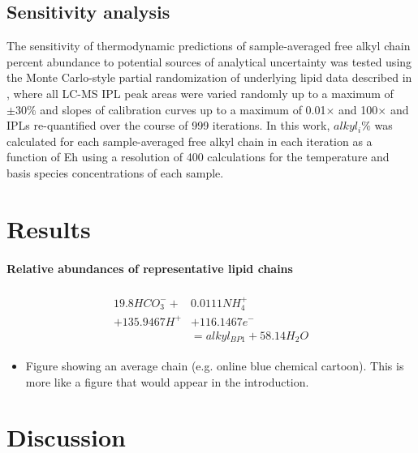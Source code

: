 \subsection{Sensitivity analysis} The sensitivity of thermodynamic predictions of sample-averaged free alkyl chain percent abundance to potential sources of analytical uncertainty was tested using the Monte Carlo-style partial randomization of underlying lipid data described in \cite{boyer2018thermophile}, where all LC-MS IPL peak areas were varied randomly up to a maximum of $\pm30\%$ and slopes of calibration curves up to a maximum of 0.01$\times$ and 100$\times$ and IPLs re-quantified over the course of 999 iterations. In this work, $alkyl_{i}\%$ was calculated for each sample-averaged free alkyl chain in each iteration as a function of Eh using a resolution of 400 calculations for the temperature and basis species concentrations of each sample.

\section{Results}
\paragraph*{Relative abundances of representative lipid chains} 


\begin{align}
\begin{split}
    19.8HCO_{3}^{-} + &0.0111NH_{4}^{+}\\
    + 135.9467H^{+} &+ 116.1467e^{-}\\
    &= alkyl_{BP1} + 58.14H_{2}O
\end{split}
\end{align}

\begin{itemize}

    \item Figure showing an average chain (e.g. online blue chemical cartoon). This is more like a figure that would appear in the introduction.
    
\end{itemize}


\section{Discussion}



